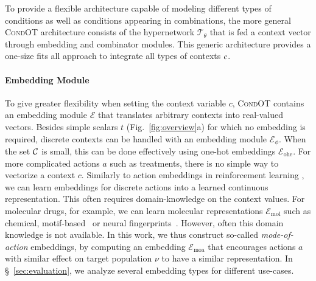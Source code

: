To provide a flexible architecture capable of modeling different types of conditions as well as conditions appearing in combinations, the more general \textsc{CondOT} architecture consists of the hypernetwork $\mathcal{T}_\theta$ that is fed a context vector through embedding and combinator modules. This generic architecture provides a one-size fits all approach to integrate all types of contexts $c$.

\paragraph{Embedding Module}
To give greater flexibility when setting the context variable $c$, \textsc{CondOT} contains an embedding module $\mathcal{E}$ that translates arbitrary contexts into real-valued vectors. Besides simple scalars $t$ (Fig.~\ref{fig:overview}a) for which no embedding is required, discrete contexts can be handled with an embedding module $\mathcal{E}_\phi$.
When the set ${\mathcal{C}}$ is small, this can be done effectively using one-hot embeddings $\mathcal{E}_\text{ohe}$.
For more complicated actions $a$ such as treatments, there is no simple way to vectorize a context $c$. Similarly to action embeddings in reinforcement learning \citep{chandak2019learning, tennenholtz2019natural}, we can learn embeddings for discrete actions into a learned continuous representation.
This often requires domain-knowledge on the context values. For molecular drugs, for example, we can learn molecular representations $\mathcal{E}_\text{mol}$ such as chemical, motif-based~\citep{rogers2010extended} or neural fingerprints~\citep{rong2020grover, schwaller2022machine}.
However, often this domain knowledge is not available.
In this work, we thus construct so-called \emph{mode-of-action} embeddings, by computing an embedding $\mathcal{E}_\text{moa}$ that encourages actions $a$ with similar effect on target population $\nu$ to have a similar representation.
In \S~\ref{sec:evaluation}, we analyze several embedding types for different use-cases.


